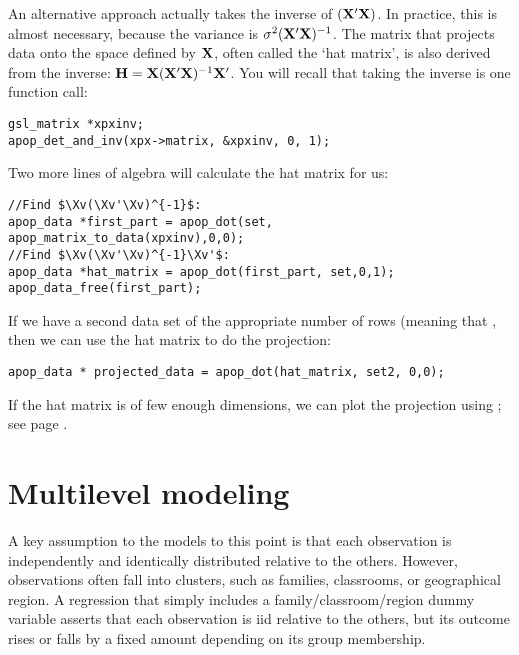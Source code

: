 An alternative approach actually takes the inverse of $({\bf X}'{\bf X})$. In practice, this is
almost necessary, because the variance is $\sigma^2 ({\bf X}'{\bf X})^{-1}$.
The matrix that projects data onto the space defined by ${\bf X}$,
often called the `hat matrix', is also derived from the inverse: ${\bf H} = {\bf X}({\bf X}'{\bf X})^{-1}{\bf X}'$. You will recall that taking the inverse is one function call:
\begin{lstlisting}
gsl_matrix *xpxinv;
apop_det_and_inv(xpx->matrix, &xpxinv, 0, 1);
\end{lstlisting}
Two more lines of algebra will calculate the hat matrix for us: 
\lstset{texcl=true}
\begin{lstlisting}
//Find $\Xv(\Xv'\Xv)^{-1}$:
apop_data *first_part = apop_dot(set, apop_matrix_to_data(xpxinv),0,0);
//Find $\Xv(\Xv'\Xv)^{-1}\Xv'$:
apop_data *hat_matrix = apop_dot(first_part, set,0,1);
apop_data_free(first_part);
\end{lstlisting}
\lstset{texcl=false} %

If we have a second data set  of the appropriate number of
rows (meaning that , then we can use the hat matrix to do the projection:\\
\begin{lstlisting}
apop_data * projected_data = apop_dot(hat_matrix, set2, 0,0);
\end{lstlisting}
If the hat matrix is of few enough dimensions, we can plot the
projection using ; see page \pageref{gnuprint}.


\section{Multilevel modeling} A key assumption to the models to this
point is that each observation is independently and identically distributed
relative to the others. However, observations often fall into clusters,
such as families, classrooms, or geographical region. 
A regression that simply includes a family/classroom/region dummy variable
asserts that each observation is iid relative to the others, but its
outcome rises or falls by a fixed amount depending on its group
membership.

